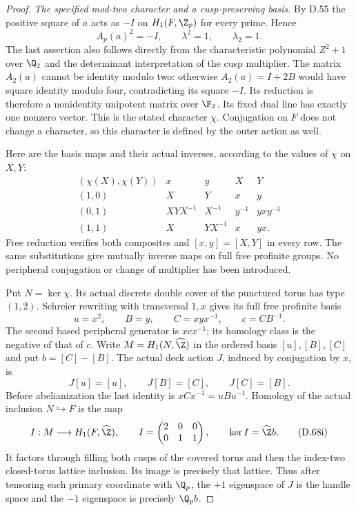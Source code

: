 \begin{proof}
\emph{The specified mod-two character and a cusp-preserving basis.}
By D.55 the positive square of $a$ acts as $-I$ on
$H_1(F,\Z_p)$ for every prime. Hence
\[
 A_p(a)^2=-I,\qquad \lambda^2=1,\qquad \lambda_2=1.       \tag{D.68e}
\]
The last assertion also follows directly from the
characteristic polynomial $Z^2+1$ over $\Q_2$ and
the determinant interpretation of the cusp multiplier.
The matrix $A_2(a)$ cannot be identity modulo two:
otherwise $A_2(a)=I+2B$ would have square identity
modulo four, contradicting its square $-I$.
Its reduction is therefore a nonidentity unipotent
matrix over $\F_2$. Its fixed dual line has exactly
one nonzero vector. This is the stated character $\chi$.
Conjugation on $F$ does not change a character, so
this character is defined by the outer action as well.

Here are the basis maps and their actual inverses,
according to the values of $\chi$ on $X,Y$:
\[
\begin{array}{c|cc|cc}
 (\chi(X),\chi(Y))&x&y&X&Y\\ \hline
 (1,0)&X&Y&x&y\\
 (0,1)&XYX^{-1}&X^{-1}&y^{-1}&yxy^{-1}\\
 (1,1)&X&YX^{-1}&x&yx.
\end{array}                                                \tag{D.68f}
\]
Free reduction verifies both composites and $[x,y]=[X,Y]$
in every row. The same substitutions give mutually
inverse maps on full free profinite groups. No peripheral
conjugation or change of multiplier has been introduced.

Put $N=\ker\chi$. Its actual discrete double cover of
the punctured torus has type $(1,2)$. Schreier rewriting
with transversal $1,x$ gives its full free profinite basis
\[
 u=x^2,\qquad B=y,\qquad C=xyx^{-1},\qquad c=CB^{-1}.
                                                               \tag{D.68g}
\]
The second based peripheral generator is $xcx^{-1}$;
its homology class is the negative of that of $c$.
Write $M=H_1(N,\widehat\Z)$ in the ordered basis
$[u],[B],[C]$ and put $b=[C]-[B]$.
The actual deck action $J$, induced by conjugation
by $x$, is
\[
 J[u]=[u],\qquad J[B]=[C],\qquad J[C]=[B].                \tag{D.68h}
\]
Before abelianization the last identity is
$xCx^{-1}=uBu^{-1}$. Homology of the actual inclusion
$N\hookrightarrow F$ is the map
\[
 I:M\longrightarrow H_1(F,\widehat\Z),\qquad
 I=\begin{pmatrix}2&0&0\\0&1&1\end{pmatrix},\qquad
 \ker I=\widehat\Z b.                                    \tag{D.68i}
\]
It factors through filling both cusps of the covered
torus and then the index-two closed-torus lattice
inclusion. Its image is precisely that lattice.
Thus after
tensoring each primary coordinate with $\Q_p$, the
$+1$ eigenspace of $J$ is the handle space and the
$-1$ eigenspace is precisely $\Q_p b$.


\end{proof}
